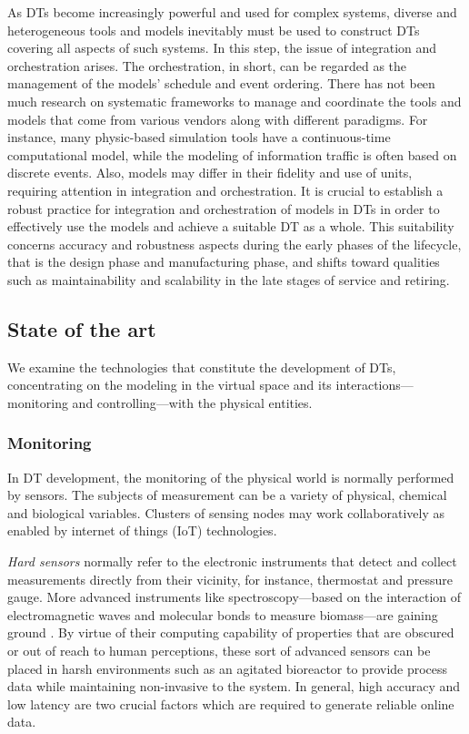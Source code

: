 \documentclass[journal,onecolumn]{IEEEtran} %
\begin{document}
As DTs become increasingly powerful and used for complex systems, diverse and heterogeneous tools and models inevitably must be used to construct DTs covering all aspects of such systems. In this step, the issue of integration and orchestration arises. The orchestration, in short, can be regarded as the management of the models' schedule and event ordering. There has not been much research on systematic frameworks to manage and coordinate the tools and models that come from various vendors along with different paradigms. For instance, many physic-based simulation tools have a continuous-time computational model, while the modeling of information traffic is often based on discrete events. Also, models may differ in their fidelity and use of units, requiring attention in integration and orchestration. It is crucial to establish a robust practice for integration and orchestration of models in DTs in order to effectively use the models and achieve a suitable DT as a whole. This suitability concerns accuracy and robustness aspects during the early phases of the lifecycle, that is the design phase and manufacturing phase, and shifts toward qualities such as maintainability and scalability in the late stages of service and retiring.   


\subsection{State of the art}\label{sec:sota}
We examine the technologies that constitute the development of DTs, concentrating on the modeling in the virtual space and its interactions---monitoring and controlling---with the physical entities.

\subsubsection{Monitoring} \label{sec:monitoring}
In DT development, the monitoring of the physical world is normally performed by sensors. The subjects of measurement can be a variety of physical, chemical and biological variables. Clusters of sensing nodes may work collaboratively as enabled by internet of things (IoT) technologies. 

\textit{Hard sensors} normally refer to the electronic instruments that detect and collect measurements directly from their vicinity, for instance, thermostat and pressure gauge. More advanced instruments like spectroscopy---based on the interaction of electromagnetic waves and molecular bonds to measure biomass---are gaining ground \cite{Gargalo2020}. By virtue of their computing capability of properties that are obscured or out of reach to human perceptions, these sort of advanced sensors can be placed in harsh environments such as an agitated bioreactor to provide process data while maintaining non-invasive to the system. In general, high accuracy and low latency are two crucial factors which are required to generate reliable online data.
\end{document}
